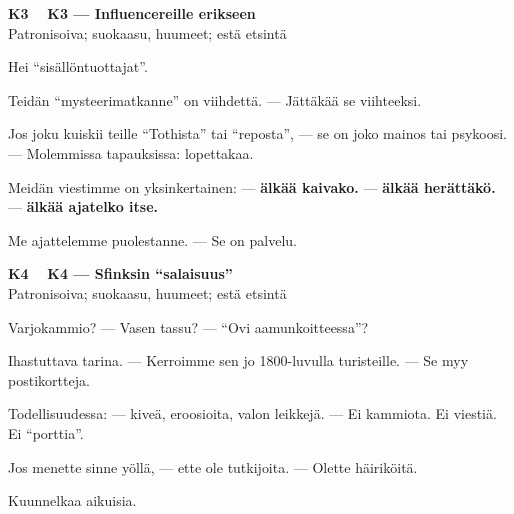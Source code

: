 \documentclass[a4paper,11pt]{article}
\begin{document}
\filbreak
\vspace{0.9mm}
\noindent
\begin{tcolorbox}[
  colframe=eaglecol,
  colback=white,
  boxrule=0.8pt,
  arc=0pt,
  outer arc=0pt,
  left=2.5mm, right=2.5mm, top=2mm, bottom=2mm,
  boxsep=0.5mm,
  sharp corners,
  enhanced,
  breakable=false
]
{\large\ttfamily\bfseries K3}~~
{\normalsize\bfseries K3 --- Influencereille erikseen}\\[0.2em]
{\small\color{black!65} Patronisoiva; suokaasu, huumeet; estä etsintä}\\[0.35em]
{\normalsize\raggedright Hei ``sisällöntuottajat''.

Teidän ``mysteerimatkanne'' on viihdettä. --- Jättäkää se viihteeksi.

Jos joku kuiskii teille ``Tothista'' tai ``reposta'', --- se on joko mainos tai psykoosi. --- Molemmissa tapauksissa: lopettakaa.

Meidän viestimme on yksinkertainen: --- \textbf{älkää kaivako.} --- \textbf{älkää herättäkö.} --- \textbf{älkää ajatelko itse.}

Me ajattelemme puolestanne. --- Se on palvelu.}
\end{tcolorbox}

\filbreak
\vspace{0.9mm}
\noindent
\begin{tcolorbox}[
  colframe=eaglecol,
  colback=white,
  boxrule=0.8pt,
  arc=0pt,
  outer arc=0pt,
  left=2.5mm, right=2.5mm, top=2mm, bottom=2mm,
  boxsep=0.5mm,
  sharp corners,
  enhanced,
  breakable=false
]
{\large\ttfamily\bfseries K4}~~
{\normalsize\bfseries K4 --- Sfinksin ``salaisuus''}\\[0.2em]
{\small\color{black!65} Patronisoiva; suokaasu, huumeet; estä etsintä}\\[0.35em]
{\normalsize\raggedright Varjokammio? --- Vasen tassu? --- ``Ovi aamunkoitteessa''?

Ihastuttava tarina. --- Kerroimme sen jo 1800-luvulla turisteille. --- Se myy postikortteja.

Todellisuudessa: --- kiveä, eroosioita, valon leikkejä. --- Ei kammiota. Ei viestiä. Ei ``porttia''.

Jos menette sinne yöllä, --- ette ole tutkijoita. --- Olette häiriköitä.

Kuunnelkaa aikuisia.}
\end{tcolorbox}
\end{document}
